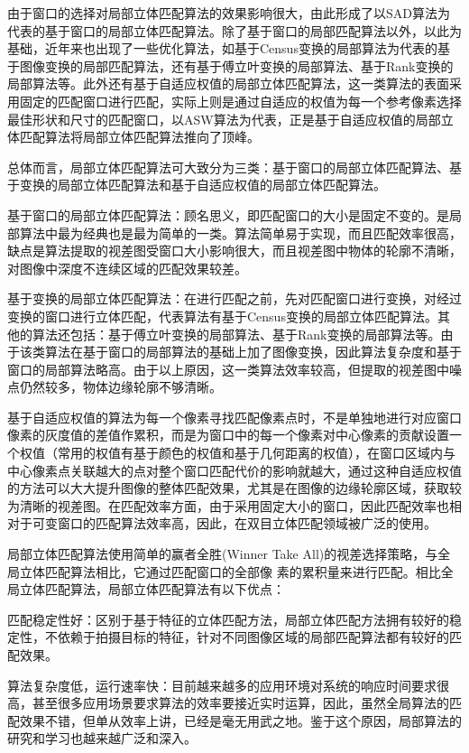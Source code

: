 由于窗口的选择对局部立体匹配算法的效果影响很大，由此形成了以SAD算法为代表的基于窗口的局部立体匹配算法。除了基于窗口的局部匹配算法以外，以此为基础，近年来也出现了一些优化算法，如基于Census变换的局部算法为代表的基于图像变换的局部匹配算法，还有基于傅立叶变换的局部算法、基于Rank变换的局部算法等。此外还有基于自适应权值的局部立体匹配算法，这一类算法的表面采用固定的匹配窗口进行匹配，实际上则是通过自适应的权值为每一个参考像素选择最佳形状和尺寸的匹配窗口，以ASW算法为代表，正是基于自适应权值的局部立体匹配算法将局部立体匹配算法推向了顶峰。

总体而言，局部立体匹配算法可大致分为三类：基于窗口的局部立体匹配算法、基于变换的局部立体匹配算法和基于自适应权值的局部立体匹配算法。 

基于窗口的局部立体匹配算法：顾名思义，即匹配窗口的大小是固定不变的。是局部算法中最为经典也是最为简单的一类。算法简单易于实现，而且匹配效率很高，缺点是算法提取的视差图受窗口大小影响很大，而且视差图中物体的轮廓不清晰，对图像中深度不连续区域的匹配效果较差。

基于变换的局部立体匹配算法：在进行匹配之前，先对匹配窗口进行变换，对经过变换的窗口进行立体匹配，代表算法有基于Census变换的局部立体匹配算法。其他的算法还包括：基于傅立叶变换的局部算法、基于Rank变换的局部算法等。由于该类算法在基于窗口的局部算法的基础上加了图像变换，因此算法复杂度和基于窗口的局部算法略高。由于以上原因，这一类算法效率较高，但提取的视差图中噪点仍然较多，物体边缘轮廓不够清晰。 

基于自适应权值的算法为每一个像素寻找匹配像素点时，不是单独地进行对应窗口像素的灰度值的差值作累积，而是为窗口中的每一个像素对中心像素的贡献设置一个权值（常用的权值有基于颜色的权值和基于几何距离的权值），在窗口区域内与中心像素点关联越大的点对整个窗口匹配代价的影响就越大，通过这种自适应权值的方法可以大大提升图像的整体匹配效果，尤其是在图像的边缘轮廓区域，获取较为清晰的视差图。在匹配效率方面，由于采用固定大小的窗口，因此匹配效率也相对于可变窗口的匹配算法效率高，因此，在双目立体匹配领域被广泛的使用。

局部立体匹配算法使用简单的赢者全胜(Winner Take  All)的视差选择策略，与全局立体匹配算法相比，它通过匹配窗口的全部像
素的累积量来进行匹配。相比全局立体匹配算法，局部立体匹配算法有以下优点： 

匹配稳定性好：区别于基于特征的立体匹配方法，局部立体匹配方法拥有较好的稳定性，不依赖于拍摄目标的特征，针对不同图像区域的局部匹配算法都有较好的匹配效果。

算法复杂度低，运行速率快：目前越来越多的应用环境对系统的响应时间要求很高，甚至很多应用场景要求算法的效率要接近实时运算，因此，虽然全局算法的匹配效果不错，但单从效率上讲，已经是毫无用武之地。鉴于这个原因，局部算法的研究和学习也越来越广泛和深入。 

